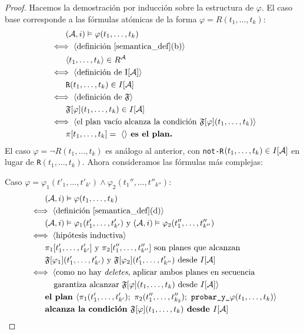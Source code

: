 \begin{proof}
Hacemos la demostración por inducción sobre la estructura de $\varphi$. El caso
base corresponde a las fórmulas atómicas de la forma $\varphi =
R(t_1,\ldots,t_k)$:
\begin{alignat*}{1}
& \quad \quad (\mathcal{A}, i) \vDash \varphi(t_1,\ldots,t_k)\\
& \iff \langle \text{definición \ref{semantica_def}(b)} \rangle \\
& \quad \quad \langle t_1,\ldots,t_k \rangle \in R^{\mathcal{A}}\\
& \iff \langle \text{definición de I[\ensuremath{\mathcal{A}}]} \rangle\\
& \quad \quad \texttt{R}(t_1,\ldots,t_k) \in I[\mathcal{A}]\\
& \iff \langle \text{definición de } \mathfrak{F} \rangle\\
& \quad \quad \mathfrak{F}[\varphi](t_1,\ldots,t_k) \in I[\mathcal{A}]\\
& \iff \langle \text{el plan vacío alcanza la condición } \mathfrak{F}[\varphi](t_1,\ldots,t_k) \rangle\\
& \quad \quad \pi[t_1,\ldots,t_k] =\ \langle  \rangle \textbf{ es el plan.}
\end{alignat*}
El caso $\varphi = \neg R(t_1,\ldots,t_k)$ es análogo al anterior, con
\texttt{not-R}$(t_1,\ldots,t_k) \in I[\mathcal{A}]$ en lugar de \texttt{R}$(t_1,\ldots,t_k)$.
Ahora consideramos las fórmulas más complejas:

Caso $\varphi = \varphi_1(t'_1,\ldots,t'_{k'}) \land \varphi_2(t_1'',\ldots,t''_{k''}) $:
\begin{alignat*}{1}
& \quad \quad (\A, i) \models \varphi(t_1,\ldots,t_k)\\
& \iff \tup{\text{definición \ref{semantica_def}(d)}}\\
& \quad \quad (\A, i) \models \varphi_1(t'_1,\ldots,t'_{k'}) \text{ y } 
(\A, i) \models \varphi_2(t''_1,\ldots,t''_{k''})\\
& \iff \tup{\text{hipótesis inductiva}}\\
& \quad \quad \pi_1[t'_1,\ldots,t'_{k'}] \text{ y } 
\pi_2[t_1'',\ldots,t''_{k''}] \text{ son planes que alcanzan }\\
& \quad \quad \FT[\varphi_1](t'_1,\ldots,t'_{k'}) \text{ y } \FT[\varphi_2](t'_1,\ldots,t'_{k''})
\text{ desde } I[\A]\\
& \iff \langle \text{como no hay \textit{deletes}, aplicar ambos planes en
secuencia }\\
& {\color{white}\iff\langle} \text{garantiza alcanzar
$\FT[\varphi](t_1,\ldots,t_k)$ desde $I[\A]$} \rangle\\
& \quad \quad \textbf{el plan }\tup{\pi_1(t'_1,\ldots,t'_{k'});\
\pi_2(t_1'',\ldots,t_{k_2}'');\ \texttt{probar\_y\_}\varphi(t_1,\ldots,t_k)} \\
& \quad \quad \textbf{alcanza la condición }
\FT[\varphi](t_1,\ldots,t_k) \textbf{ desde } I[\A]
\end{alignat*}


\end{proof}
